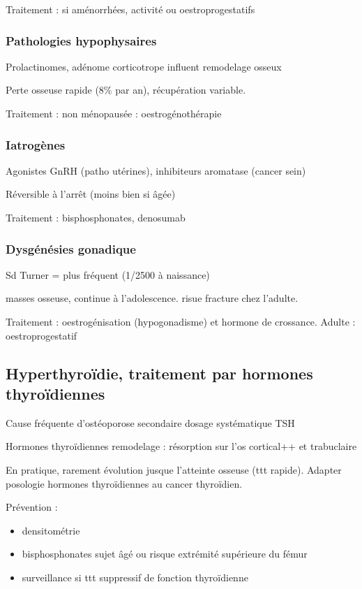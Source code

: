 \documentclass[11pt]{article}
\begin{document}
Traitement : si aménorrhées, \dec activité ou oestroprogestatifs

\subsubsection{Pathologies hypophysaires}
\label{sec:orgce8b109}
Prolactinomes, adénome corticotrope influent remodelage osseux

Perte osseuse rapide (8\% par an), récupération variable.

Traitement : \female non ménopausée : oestrogénothérapie

\subsubsection{Iatrogènes}
\label{sec:org9b28fa3}
Agonistes GnRH (patho utérines), inhibiteurs aromatase (cancer sein)

Réversible à l'arrêt (moins bien si âgée)

Traitement : bisphosphonates, denosumab

\subsubsection{Dysgénésies gonadique}
\label{sec:orgcd84585}
Sd Turner = plus fréquent (1/2500 à naissance)

\dec masses osseuse, continue à l'adolescence. \inc risue fracture chez
l'adulte.

Traitement : oestrogénisation (hypogonadisme) et hormone de crossance. Adulte :
oestroprogestatif

\subsection{Hyperthyroïdie, traitement par hormones thyroïdiennes}
\label{sec:org548a7fd}
Cause fréquente d'ostéoporose secondaire \thus dosage systématique TSH

Hormones thyroïdiennes \inc remodelage : résorption sur l'os cortical++ et trabuclaire

En pratique, rarement évolution jusque l'atteinte osseuse (ttt
rapide). Adapter posologie hormones thyroïdiennes au cancer thyroïdien.

Prévention :
\begin{itemize}
\item densitométrie
\item bisphosphonates sujet âgé ou risque extrémité supérieure du fémur
\item surveillance si ttt suppressif de fonction thyroïdienne
\end{itemize}
\end{document}
